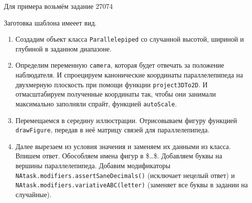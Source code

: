 Для примера возьмём задание 27074


Заготовка шаблона имееет вид.



\begin{enumerate}
	\item Создадим объект класса \texttt{Parallelepiped} со случанной высотой, шириной и глубиной в заданном диапазоне. 
	
	\item Определим переменную \texttt{camera}, которая будет отвечать за положение наблюдателя. И спроецируем канонические координаты параллелепипеда на двухмерную плоскость при помощи функции \texttt{project3DTo2D}. И отмасштабируем полученные координаты так, чтобы они занимали максимально заполняли спрайт, функцией \texttt{autoScale}.
	
	\item Перемещаемся в середину иллюстрации. Отрисовываем фигуру функцией \texttt{drawFigure}, передав в неё матрицу связей для параллелепипеда. 
	
	\item Далее вырезаем из условия значения и заменяем их данными из класса. Впишем ответ. Обособляем имена фигур в \$\dots\$. Добавляем буквы на вершины параллелепипеда. Добавим модификаторы          \texttt{NAtask.modifiers.assertSaneDecimals()} (исключает нецелый ответ) и
	\texttt{NAtask.modifiers.variativeABC(letter)} (заменяет все буквы в задании на случайные).
	
\end{enumerate}
